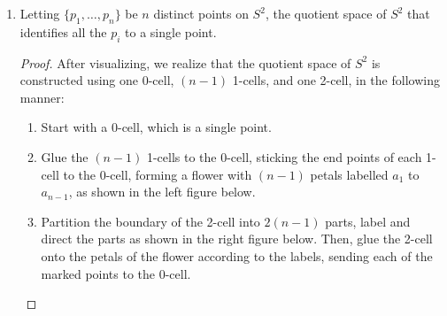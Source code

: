 \documentclass{article}
\begin{document}
\begin{enumerate}
\begin{enumerate}
\begin{proof}
          From construction, we summarize that an $n$-torus is built from
          $\binom{n}{i}$ $i$-cells, for $0\leq i\leq n$. \\
        \end{proof}

      \item Letting $\{p_1,\ldots,p_n\}$ be $n$ distinct points on $S^2$,
        the quotient space of $S^2$ that identifies all the $p_i$ to a
        single point.

        \begin{proof}
          After visualizing, we realize that the quotient space of
          $S^2$ is constructed using one 0-cell, $(n-1)$ 1-cells, and one
          2-cell, in the following manner:
          \begin{enumerate}
            \item Start with a 0-cell, which is a single point.
            \item Glue the $(n-1)$ 1-cells to the 0-cell, sticking the end
              points of each 1-cell to the 0-cell, forming a flower with
              $(n-1)$ petals labelled $a_1$ to $a_{n-1}$, as shown in the
              left figure below.
            \item Partition the boundary of the 2-cell into $2(n-1)$ parts,
              label and direct the parts as shown in the right figure
              below. Then, glue the 2-cell onto the petals of the flower
              according to the labels, sending each of the marked points to
              the 0-cell.
          \end{enumerate}

          \begin{center}
\end{center}
\end{proof}
\end{enumerate}
\end{enumerate}
\end{document}
